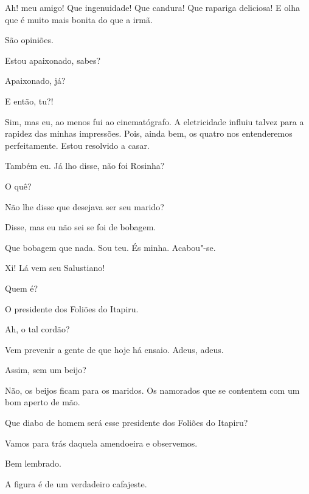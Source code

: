 \begin{linenumbers}
  Ah!
meu amigo! Que ingenuidade! Que candura! Que rapariga deliciosa! E olha
que é muito mais bonita do que a irmã.

 São opiniões.

 Estou apaixonado,
sabes?

 Apaixonado, já?

 E então, tu?!

 Sim, mas eu, ao
menos fui ao cinematógrafo. A eletricidade influiu
talvez para a rapidez das minhas impressões. Pois,
ainda bem, os quatro nos entenderemos perfeitamente. Estou
resolvido a casar.

 Também eu. Já lho
disse,  não foi Rosinha?

 O quê?

 Não lhe disse que
desejava ser seu marido?

 Disse, mas eu
não sei se foi de bobagem.  

 Que
bobagem que nada. Sou teu. És minha. Acabou"-se.

 Xi! Lá
vem seu Salustiano!

 Quem é?

 O presidente dos Foliões do Itapiru.

 Ah, o tal cordão?

 Vem prevenir a
gente de que hoje há ensaio. Adeus, adeus.

 Assim, sem um
beijo?

 Não, os beijos
ficam para os maridos. Os namorados que se contentem
com um bom aperto de mão. 

 Que diabo de homem
será esse presidente dos Foliões do Itapiru?

 Vamos para
trás daquela amendoeira e observemos.

 Bem lembrado.

{}




 A figura
é de um verdadeiro cafajeste.


\end{linenumbers}

